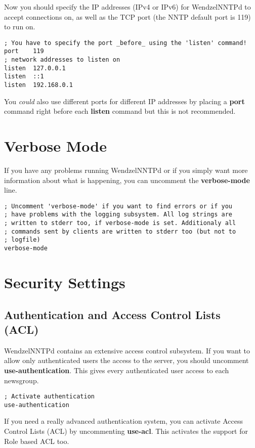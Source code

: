 Now you should specify the IP addresses (IPv4 or IPv6) for WendzelNNTPd to accept connections on, as well as the TCP port (the NNTP default port is 119) to run on.

\begin{verbatim}
; You have to specify the port _before_ using the 'listen' command!
port	119
; network addresses to listen on
listen	127.0.0.1
listen	::1
listen	192.168.0.1
\end{verbatim}

You {\it could} also use different ports for different IP addresses by placing a {\bf port} command right before each {\bf listen} command but this is not recommended.

\section{Verbose Mode}

If you have any problems running WendzelNNTPd or if you simply want more information about what is happening, you can uncomment the {\bf verbose-mode} line.

\begin{verbatim}
; Uncomment 'verbose-mode' if you want to find errors or if you
; have problems with the logging subsystem. All log strings are
; written to stderr too, if verbose-mode is set. Additionaly all
; commands sent by clients are written to stderr too (but not to
; logfile)
verbose-mode
\end{verbatim}

\section{Security Settings}

\subsection{Authentication and Access Control Lists (ACL)}

WendzelNNTPd contains an extensive access control subsystem. If you want to allow only authenticated users the access to the server, you should uncomment {\bf use-authentication}. This gives every authenticated user access to each newsgroup.

\begin{verbatim}
; Activate authentication
use-authentication
\end{verbatim}

If you need a really advanced authentication system, you can activate Access Control Lists (ACL) by uncommenting {\bf use-acl}. This activates the support for Role based ACL too.

